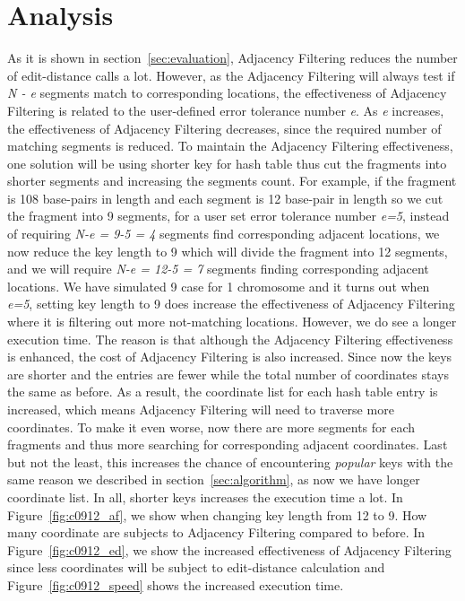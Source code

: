 \section{Analysis} \label{sec:analysis} 

As it is shown in section~\ref{sec:evaluation}, Adjacency Filtering reduces the
number of edit-distance calls a lot. However, as the Adjacency Filtering will
always test if \textit{N - e} segments match to corresponding locations, the
effectiveness of Adjacency Filtering is related to the user-defined error
tolerance number \textit{e}. As \textit{e} increases, the effectiveness of
Adjacency Filtering decreases, since the required number of matching segments
is reduced.  To maintain the Adjacency Filtering effectiveness, one solution
will be using shorter key for hash table thus cut the fragments into shorter
segments and increasing the segments count. For example, if the fragment is 108
base-pairs in length and each segment is 12 base-pair in length so we cut the
fragment into 9 segments, for a user set error tolerance number \textit{e=5},
instead of requiring \textit{N-e = 9-5 = 4} segments find corresponding
adjacent locations, we now reduce the key length to 9 which will divide the
fragment into 12 segments, and we will require \textit{N-e = 12-5 = 7} segments
finding corresponding adjacent locations. We have simulated 9 case for 1
chromosome and it turns out when \textit{e=5}, setting key length to 9 does
increase the effectiveness of Adjacency Filtering where it is filtering out
more not-matching locations. However, we do see a longer execution time. The
reason is that although the Adjacency Filtering effectiveness is enhanced, the
cost of Adjacency Filtering is also increased. Since now the keys are shorter
and the entries are fewer while the total number of coordinates stays the same
as before. As a result, the coordinate list for each hash table entry is
increased, which means Adjacency Filtering will need to traverse more
coordinates. To make it even worse, now there are more segments for each
fragments and thus more searching for corresponding adjacent coordinates. Last
but not the least, this increases the chance of encountering \textit{popular}
keys with the same reason we described in section~\ref{sec:algorithm}, as now
we have longer coordinate list. In all, shorter keys increases the execution
time a lot. In Figure~\ref{fig:c0912_af}, we show when changing key length from 12 to 9. How
many coordinate are subjects to Adjacency Filtering compared to before. In
Figure~\ref{fig:c0912_ed}, we show the increased effectiveness of Adjacency Filtering since
less coordinates will be subject to edit-distance calculation and Figure~\ref{fig:c0912_speed}
shows the increased execution time. \\ 

